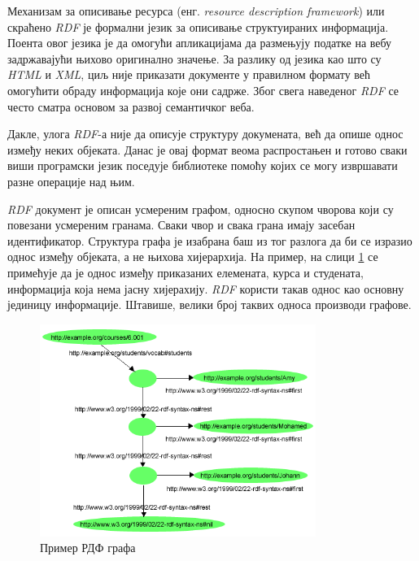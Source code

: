 \documentclass[12pt,oneside]{memoir}
\begin{document}
Механизам за описивање ресурса (енг. \textit{resource description framework}) или скраћено \textit{RDF} је формални језик за описивање структуираних информација. Поента овог језика је да омогући апликацијама да размењују податке на вебу задржавајући њихово оригинално значење. За разлику од језика као што су \textit{HTML} и \textit{XML}, циљ није приказати документе у правилном формату већ омогућити обраду информација које они садрже. Због свега наведеног \textit{RDF} се често сматра основом за развој семантичког веба. \cite{semantic}

Дакле, улога \textit{RDF}-а није да описује структуру докумената, већ да опише однос између неких објеката. Данас је овај формат веома распростањен и готово сваки виши програмски језик поседује библиотеке помоћу којих се могу извршавати разне операције над њим. \cite{semantic}
 
\textit{RDF} документ је описан усмереним графом, односно скупом чворова који су повезани усмереним гранама. Сваки чвор и свака грана имају засебан идентификатор. Структура графа је изабрана баш из тог разлога да би се изразио однос између објеката, а не њихова хијерархија. На пример, на слици \ref{fig:semantic_rdf_graph_example} се примећује да је однос између приказаних елемената, курса и студената, информација која нема јасну хијерахију. \textit{RDF} користи такав однос као основну јединицу информације. Штавише, велики број таквих односа производи графове. \cite{semantic}

\begin{figure}[!ht]
  \centering
  \includegraphics[width=0.8\textwidth]{pictures/rdf_graph_example.png}
  \caption{Пример РДФ графа}
  \label{fig:semantic_rdf_graph_example}
\end{figure}
\end{document}
